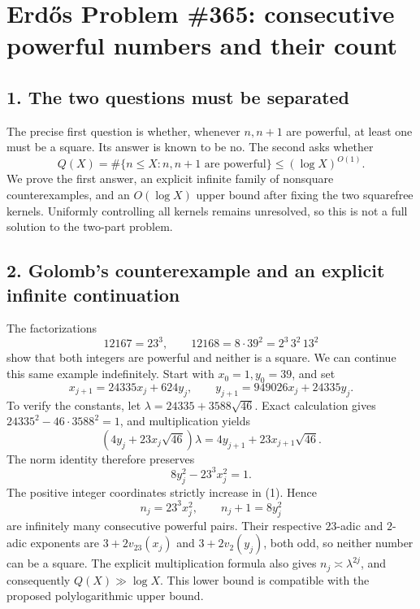 \section*{Erd\H{o}s Problem \#365: consecutive powerful numbers and their count}
\subsection*{1. The two questions must be separated}
The precise first question is whether, whenever $n,n+1$ are powerful,
at least one must be a square. Its answer is known to be no.
The second asks whether
\[
 Q(X)=\#\{n\le X:n,n+1\text{ are powerful}\}
       \le(\log X)^{O(1)}.
\]
We prove the first answer, an explicit infinite family of nonsquare
counterexamples, and an $O(\log X)$ upper bound after fixing the two
squarefree kernels. Uniformly controlling all kernels remains
unresolved, so this is not a full solution to the two-part problem.

\subsection*{2. Golomb's counterexample and an explicit infinite continuation}
The factorizations
\[
 12167=23^3,\qquad12168=8\cdot39^2=2^3\,3^2\,13^2
\]
show that both integers are powerful and neither is a square.
We can continue this same example indefinitely.
Start with $x_0=1,y_0=39$, and set
\[
 x_{j+1}=24335x_j+624y_j,\qquad
 y_{j+1}=949026x_j+24335y_j.                       \tag{1}
\]
To verify the constants, let
$\lambda=24335+3588\sqrt{46}$. Exact calculation gives
$24335^2-46\cdot3588^2=1$, and multiplication yields
\[
 (4y_j+23x_j\sqrt{46})\lambda
       =4y_{j+1}+23x_{j+1}\sqrt{46}.
\]
The norm identity therefore preserves
\[
 8y_j^2-23^3x_j^2=1.
\]
The positive integer coordinates strictly increase in (1). Hence
\[
 n_j=23^3x_j^2,\qquad n_j+1=8y_j^2
\]
are infinitely many consecutive powerful pairs.
Their respective $23$-adic and $2$-adic exponents are
$3+2v_{23}(x_j)$ and $3+2v_2(y_j)$, both odd, so neither number
can be a square.
The explicit multiplication formula also gives
$n_j\asymp\lambda^{2j}$, and consequently $Q(X)\gg\log X$.
This lower bound is compatible with the proposed polylogarithmic upper bound.

